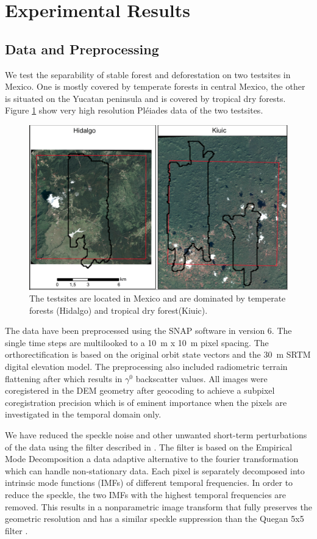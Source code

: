 \documentclass{article}
\begin{document}
\section{Experimental Results}
\subsection{Data and Preprocessing}
We test the separability of stable forest and deforestation on two testsites in Mexico.
One is mostly covered by temperate forests in central Mexico,
the other is situated on the Yucatan peninsula and is covered by tropical dry forests.
Figure \ref{testsites} show very high resolution Pléiades data of the two testsites.

\begin{figure}
  \includegraphics[width=\textwidth]{figs/SEN4REDD_testsites.png}
  \caption{The testsites are located in Mexico and are dominated by temperate forests (Hidalgo) and tropical dry forest(Kiuic).}
  \label{testsites}
\end{figure}

The data have been preprocessed using the SNAP software \cite{SNAP} in version 6.
The single time steps are multilooked to a \SI{10}{\m} x \SI{10}{\m} pixel spacing.
The orthorectification is based on the original orbit state vectors and the \SI{30}{\m} SRTM digital elevation model\cite{SRTM}.
The preprocessing also included radiometric terrain flattening after \cite{Small} which results in $\gamma^0$ backscatter values.
All images were coregistered in the DEM geometry after geocoding to achieve a subpixel coregistration precision which is of eminent importance when the pixels are investigated in the temporal domain only.

We have reduced the speckle noise and other unwanted short-term perturbations of the data using the filter described in \cite{Cremer2018}.
The filter is based on the Empirical Mode Decomposition a data adaptive alternative to the fourier transformation which can handle non-stationary data.
Each pixel is separately decomposed into intrinsic mode functions (IMFs) of different temporal frequencies.
In order to reduce the speckle, the two IMFs with the highest temporal frequencies are removed.
This results in a nonparametric image transform that fully preserves the geometric resolution and has a similar speckle suppression than the Quegan 5x5 filter \cite{Quegan_2001}.
\end{document}
